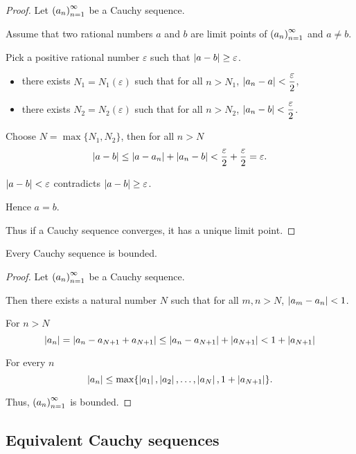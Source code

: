 \begin{proof}
    Let ${\left({a_{n}}\right)}^{\infty}_{n=1}$ be a Cauchy sequence.

    Assume that two rational numbers $a$ and $b$ are limit points of ${\left({a_{n}}\right)}^{\infty}_{n=1}$ and $a\ne b$.

    Pick a positive rational number $\varepsilon$ such that $\left\vert{a - b}\right\vert\ge\varepsilon$.
    \begin{itemize}
        \item there exists $N_{1} = N_{1}(\varepsilon)$ such that for all $n > N_{1}$, $\left\vert{a_{n} - a}\right\vert < \dfrac{\varepsilon}{2}$,
        \item there exists $N_{2} = N_{2}(\varepsilon)$ such that for all $n > N_{2}$, $\left\vert{a_{n} - b}\right\vert < \dfrac{\varepsilon}{2}$.
    \end{itemize}

    Choose $N = \max\{ N_{1}, N_{2} \}$, then for all $n > N$
    \[
        \left\vert{a - b}\right\vert\le \left\vert{a - a_{n}}\right\vert + \left\vert{a_{n} - b}\right\vert < \frac{\varepsilon}{2} + \frac{\varepsilon}{2} = \varepsilon.
    \]

    $\left\vert{a - b}\right\vert < \varepsilon$ contradicts $\left\vert{a - b}\right\vert\ge\varepsilon$.

    Hence $a = b$.

    Thus if a Cauchy sequence converges, it has a unique limit point.
\end{proof}

\begin{theorem}
    Every Cauchy sequence is bounded.
\end{theorem}

\begin{proof}
    Let ${\left({a_{n}}\right)}^{\infty}_{n=1}$ be a Cauchy sequence.

    Then there exists a natural number $N$ such that for all $m, n > N$, $\left\vert{a_{m} - a_{n}}\right\vert < 1$.

    For $n > N$
    \[
        \left\vert{a_{n}}\right\vert = \left\vert{a_{n} - a_{N+1} + a_{N+1}}\right\vert\le \left\vert{a_{n} - a_{N+1}}\right\vert + \left\vert{a_{N+1}}\right\vert < 1 + \left\vert{a_{N+1}}\right\vert
    \]

    For every $n$
    \[
        \left\vert{a_{n}}\right\vert\le \max\{ \left\vert{a_{1}}\right\vert, \left\vert{a_{2}}\right\vert, \ldots, \left\vert{a_{N}}\right\vert, 1 + \left\vert{a_{N+1}}\right\vert \}.
    \]

    Thus, ${\left({a_{n}}\right)}^{\infty}_{n=1}$ is bounded.
\end{proof}

\subsection{Equivalent Cauchy sequences}

